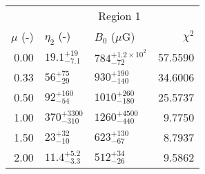 \begin{tabular}{@{}rllr@{}}
\toprule
{} & \multicolumn{3}{c}{Region 1} \\
\cmidrule(l){2-4}
$\mu$ (-) & $\eta_2$ (-) & $B_0$ ($\mu$G) & $\chi^2$\\
\midrule
0.00 & ${19.1}^{+19}_{-7.1}$ & ${784}^{+1.2 \times 10^{2}}_{-72}$ & 57.5590\\
0.33 & ${56}^{+75}_{-29}$ & $930^{+190}_{-140}$ & 34.6006\\
0.50 & ${92}^{+160}_{-54}$ & ${1010}^{+260}_{-180}$ & 25.5737\\
1.00 & ${370}^{+3300}_{-310}$ & ${1260}^{+4500}_{-440}$ & 9.7750\\
1.50 & ${23}^{+32}_{-10}$ & ${623}^{+130}_{-67}$ & 8.7937\\
2.00 & ${11.4}^{+5.2}_{-3.3}$ & ${512}^{+34}_{-26}$ & 9.5862\\
\bottomrule
\end{tabular} 
